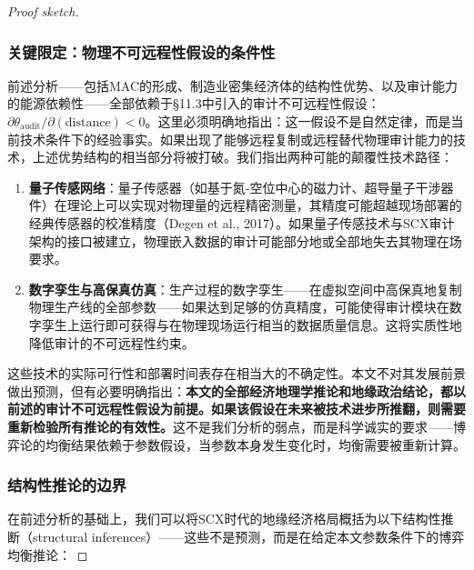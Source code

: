 \documentclass[12pt,a4paper]{ctexart}
\theoremstyle{definition}
\theoremstyle{remark}
\begin{document}
\begin{proof}[Proof sketch]
\subsubsection*{关键限定：物理不可远程性假设的条件性}

前述分析——包括MAC的形成、制造业密集经济体的结构性优势、以及审计能力的能源依赖性——全部依赖于§11.3中引入的审计不可远程性假设：$\partial \theta_{\text{audit}} / \partial (\text{distance}) < 0$。这里必须明确地指出：这一假设不是自然定律，而是当前技术条件下的经验事实。如果出现了能够远程复制或远程替代物理审计能力的技术，上述优势结构的相当部分将被打破。我们指出两种可能的颠覆性技术路径：

\begin{enumerate}[label=(\roman*)]
    \item \textbf{量子传感网络}：量子传感器（如基于氮-空位中心的磁力计、超导量子干涉器件）在理论上可以实现对物理量的远程精密测量，其精度可能超越现场部署的经典传感器的校准精度（Degen et al., 2017）。如果量子传感技术与SCX审计架构的接口被建立，物理嵌入数据的审计可能部分地或全部地失去其物理在场要求。
    \item \textbf{数字孪生与高保真仿真}：生产过程的数字孪生——在虚拟空间中高保真地复制物理生产线的全部参数——如果达到足够的仿真精度，可能使得审计模块在数字孪生上运行即可获得与在物理现场运行相当的数据质量信息。这将实质性地降低审计的不可远程性约束。
\end{enumerate}

这些技术的实际可行性和部署时间表存在相当大的不确定性。本文不对其发展前景做出预测，但有必要明确指出：\textbf{本文的全部经济地理学推论和地缘政治结论，都以前述的审计不可远程性假设为前提。如果该假设在未来被技术进步所推翻，则需要重新检验所有推论的有效性。}这不是我们分析的弱点，而是科学诚实的要求——博弈论的均衡结果依赖于参数假设，当参数本身发生变化时，均衡需要被重新计算。

\subsubsection*{结构性推论的边界}

在前述分析的基础上，我们可以将SCX时代的地缘经济格局概括为以下结构性推断（structural inferences）——这些不是预测，而是在给定本文参数条件下的博弈均衡推论：


\end{proof}
\end{document}
